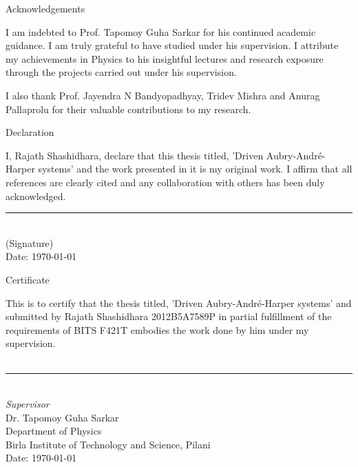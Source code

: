 \thispagestyle{empty}

\begin{center}
 \LARGE
 Acknowledgements
\end{center} \normalsize \vspace{2.0cm}
I am indebted to Prof. Tapomoy Guha Sarkar for his continued academic guidance. I am truly grateful to have studied under his supervision. I attribute my achievements in Physics
to his insightful lectures and research exposure through the projects carried out under his supervision.

I also thank Prof. Jayendra N Bandyopadhyay, Tridev Mishra and Anurag Pallaprolu for their valuable contributions to my research.
\vfil

\clearpage
\thispagestyle{empty}
\begin{center}
  \LARGE
  Declaration
\end{center} \normalsize \vspace{2.0cm}
I, Rajath Shashidhara, declare that this thesis titled, 
'Driven Aubry-Andr\'e-Harper systems' and 
the work presented in it is my original work. I affirm that all references are clearly cited and 
any collaboration with others has been duly acknowledged.
\vspace{5.0cm}\\
\rule[1em]{25em}{0.5pt}\\
(Signature) \vspace{0.5cm}\\
Date: \today \\
\vfil

\clearpage
\thispagestyle{empty}

\begin{center}
  \LARGE
  Certificate
\end{center} \normalsize \vspace{2.0cm}
This is to certify that the thesis titled,  
'Driven Aubry-Andr\'e-Harper systems' and submitted by
 Rajath Shashidhara 2012B5A7589P in partial fulfillment of the requirements of BITS F421T embodies the work done
 by him under my supervision.\\
\vspace{5.0cm}\\
\rule[1em]{25em}{0.5pt}\\
\large
\emph{Supervisor} \vspace{0.5cm}\\
Dr. Tapomoy Guha Sarkar\\
\normalsize
Department of Physics\\
Birla Institute of Technology and Science, Pilani \vspace{0.5cm}\\
Date: \today \\
\vfil
\tableofcontents
